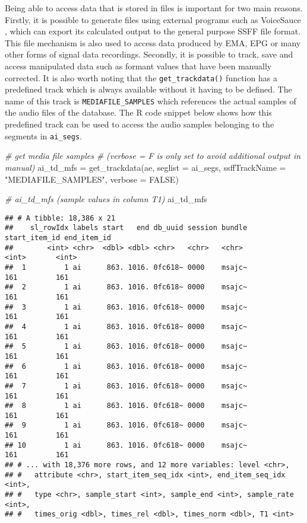 \documentclass[
]{book}
\newenvironment{Shaded}{\begin{snugshade}}{\end{snugshade}}
\newcommand{\AttributeTok}[1]{\textcolor[rgb]{0.77,0.63,0.00}{#1}}
\newcommand{\CommentTok}[1]{\textcolor[rgb]{0.56,0.35,0.01}{\textit{#1}}}
\newcommand{\ConstantTok}[1]{\textcolor[rgb]{0.00,0.00,0.00}{#1}}
\newcommand{\FunctionTok}[1]{\textcolor[rgb]{0.00,0.00,0.00}{#1}}
\newcommand{\NormalTok}[1]{#1}
\newcommand{\OtherTok}[1]{\textcolor[rgb]{0.56,0.35,0.01}{#1}}
\newcommand{\StringTok}[1]{\textcolor[rgb]{0.31,0.60,0.02}{#1}}
\begin{document}
Being able to access data that is stored in files is important for two main reasons. Firstly, it is possible to generate files using external programs such as VoiceSauce \citep{shue:2011a}, which can export its calculated output to the general purpose SSFF file format. This file mechanism is also used to access data produced by EMA, EPG or many other forms of signal data recordings. Secondly, it is possible to track, save and access manipulated data such as formant values that have been manually corrected. It is also worth noting that the \texttt{get\_trackdata()} function has a predefined track which is always available without it having to be defined. The name of this track is \texttt{MEDIAFILE\_SAMPLES} which references the actual samples of the audio files of the database. The R code snippet below shows how this predefined track can be used to access the audio samples belonging to the segments in \texttt{ai\_segs}.

\begin{Shaded}
\begin{Highlighting}[]
\CommentTok{\# get media file samples}
\CommentTok{\# (verbose = F is only set to avoid additional output in manual)}
\NormalTok{ai\_td\_mfs }\OtherTok{=} \FunctionTok{get\_trackdata}\NormalTok{(ae,}
                          \AttributeTok{seglist =}\NormalTok{ ai\_segs,}
                          \AttributeTok{ssffTrackName =} \StringTok{"MEDIAFILE\_SAMPLES"}\NormalTok{,}
                          \AttributeTok{verbose =} \ConstantTok{FALSE}\NormalTok{)}

\CommentTok{\# ai\_td\_mfs (sample values in column T1)}
\NormalTok{ai\_td\_mfs}
\end{Highlighting}
\end{Shaded}

\begin{verbatim}
## # A tibble: 18,386 x 21
##    sl_rowIdx labels start   end db_uuid session bundle start_item_id end_item_id
##        <int> <chr>  <dbl> <dbl> <chr>   <chr>   <chr>          <int>       <int>
##  1         1 ai      863. 1016. 0fc618~ 0000    msajc~           161         161
##  2         1 ai      863. 1016. 0fc618~ 0000    msajc~           161         161
##  3         1 ai      863. 1016. 0fc618~ 0000    msajc~           161         161
##  4         1 ai      863. 1016. 0fc618~ 0000    msajc~           161         161
##  5         1 ai      863. 1016. 0fc618~ 0000    msajc~           161         161
##  6         1 ai      863. 1016. 0fc618~ 0000    msajc~           161         161
##  7         1 ai      863. 1016. 0fc618~ 0000    msajc~           161         161
##  8         1 ai      863. 1016. 0fc618~ 0000    msajc~           161         161
##  9         1 ai      863. 1016. 0fc618~ 0000    msajc~           161         161
## 10         1 ai      863. 1016. 0fc618~ 0000    msajc~           161         161
## # ... with 18,376 more rows, and 12 more variables: level <chr>,
## #   attribute <chr>, start_item_seq_idx <int>, end_item_seq_idx <int>,
## #   type <chr>, sample_start <int>, sample_end <int>, sample_rate <int>,
## #   times_orig <dbl>, times_rel <dbl>, times_norm <dbl>, T1 <int>
\end{verbatim}
\end{document}
